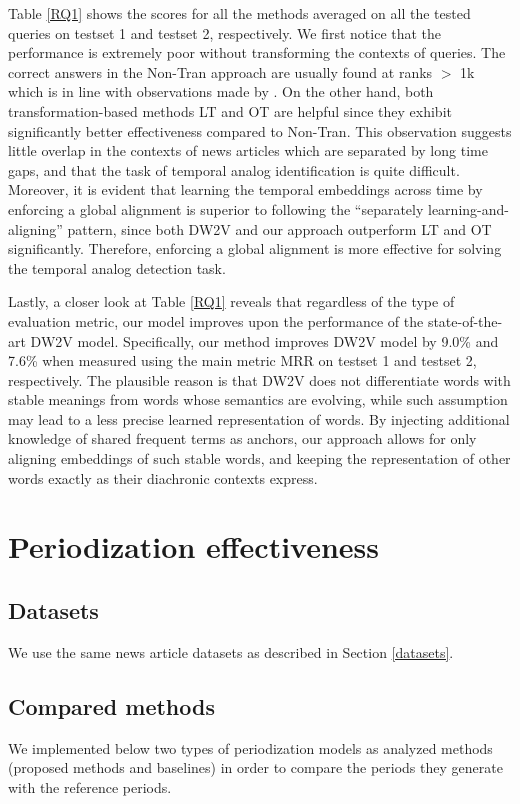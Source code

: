 \documentclass[output=paper]{langsci/langscibook}
\begin{document}
Table \ref{RQ1} shows the scores for all the methods averaged on all the tested queries on testset 1 and testset 2, respectively. We first notice that the performance is extremely poor without transforming the contexts of queries. The correct answers in the Non-Tran approach are usually found at ranks $>$ 1k which is in line with observations made by \citet{zhang-etal-2015-omnia}. 
On the other hand, both transformation-based methods LT and OT are helpful since they exhibit significantly better effectiveness compared to Non-Tran. This observation suggests little overlap in the contexts of news articles which are separated by long time gaps, and that the task of temporal analog identification is quite difficult.
Moreover, it is evident that learning the temporal embeddings across time by enforcing a global alignment is superior to following the ``separately learning-and-aligning'' pattern, since both DW2V and our approach outperform LT and OT significantly. Therefore, enforcing a global alignment is more effective for solving the temporal analog detection task.

Lastly, a closer look at Table \ref{RQ1} reveals that regardless of the type of evaluation metric, our model improves upon the performance of the state-of-the-art DW2V model. Specifically, our method improves DW2V model by 9.0\% and 7.6\% when measured using the main metric MRR on testset 1 and testset 2, respectively. The plausible reason is that DW2V does not differentiate words with stable meanings from words whose semantics are evolving, while such assumption may lead to a less precise learned representation of words. By injecting additional knowledge of shared frequent terms as anchors, our approach allows for only aligning embeddings of such stable words, and keeping the representation of other words exactly as their diachronic contexts express.

\section{Periodization effectiveness}
\label{periodization_effectiveness}

\subsection{Datasets}
We use the same news article datasets as described in Section \ref{datasets}.

\subsection{Compared methods}
We implemented below two types of periodization models as analyzed methods (proposed methods and baselines) in order to compare the periods they generate with the reference periods.
\end{document}
